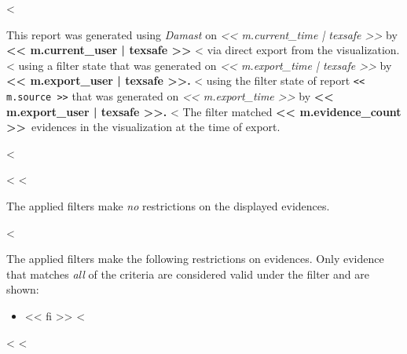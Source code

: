 <%

This report was generated using \emph{Damast} on
\emph{<< m.current_time | texsafe >>}
by \textbf{<< m.current_user | texsafe >>}
  <%
  via direct export from the visualization.
  <%
  using a filter state that was generated on
  \emph{<< m.export_time | texsafe >>}
  by
  \textbf{<< m.export_user | texsafe >>.}
  <%
  using the filter state of report \texttt{<< m.source >>}
  that was generated on
  \emph{<< m.export_time >>}
  by
  \textbf{<< m.export_user | texsafe >>.}
  <%
  The filter matched
  \textbf{<< m.evidence_count >>}~evidences
  in the visualization at the time of export.

<%


<%
<%

The applied filters make \emph{no} restrictions on the displayed evidences.

<%

The applied filters make the following restrictions on evidences.
Only evidence that matches \emph{all} of the criteria are considered valid under the filter and are shown:

\begin{itemize}
  <%
  \item << fi >>
  <%
\end{itemize}
<%
<%

